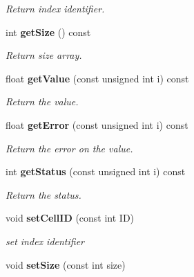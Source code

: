 \begin{DoxyCompactItemize}
\begin{DoxyCompactList}\small\item\em Return index identifier. \item\end{DoxyCompactList}\item 
int {\bf getSize} () const \label{classCALICE_1_1SimpleValueVector_aa49ebdd8cc44aef01a259cb922bc3b54}

\begin{DoxyCompactList}\small\item\em Return size array. \item\end{DoxyCompactList}\item 
float {\bf getValue} (const unsigned int i) const \label{classCALICE_1_1SimpleValueVector_afc51755de318aad884abd119ba5f6a60}

\begin{DoxyCompactList}\small\item\em Return the value. \item\end{DoxyCompactList}\item 
float {\bf getError} (const unsigned int i) const \label{classCALICE_1_1SimpleValueVector_aaa1ef44b64800f632c44ee5e6415e5cf}

\begin{DoxyCompactList}\small\item\em Return the error on the value. \item\end{DoxyCompactList}\item 
int {\bf getStatus} (const unsigned int i) const \label{classCALICE_1_1SimpleValueVector_abeb48e79ede23512335a9b4c4a094e4b}

\begin{DoxyCompactList}\small\item\em Return the status. \item\end{DoxyCompactList}\item 
void {\bf setCellID} (const int ID)\label{classCALICE_1_1SimpleValueVector_a4465a0dbf03078fe8a4aafde0c90b2c7}

\begin{DoxyCompactList}\small\item\em set index identifier \item\end{DoxyCompactList}\item 
void {\bf setSize} (const int size)\label{classCALICE_1_1SimpleValueVector_a4b34a565e96ed25beea6d42458167259}


\end{DoxyCompactItemize}
